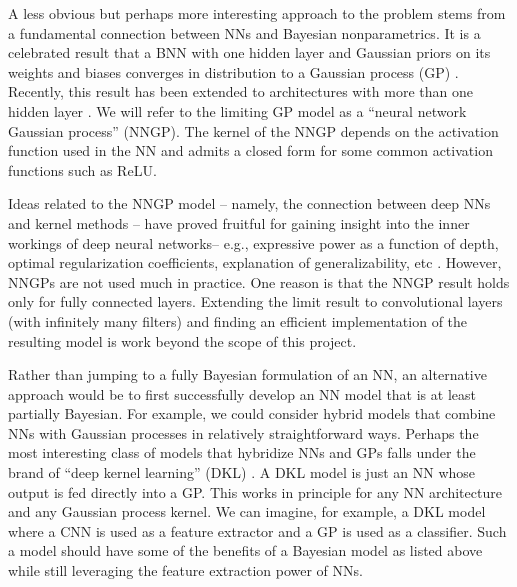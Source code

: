 \documentclass{article}
\begin{document}
A less obvious but perhaps more interesting approach to the problem stems from a fundamental connection between NNs and Bayesian nonparametrics. It is a celebrated result that a BNN with one hidden layer and Gaussian priors on its weights and biases converges in distribution to a Gaussian process (GP) \cite{neal1996priors, williams1997computing}. Recently, this result has been extended to architectures with more than one hidden layer \cite{LeeNNGP, MatthewsGhahramaniGPWide}. We will refer to the limiting GP model as a ``neural network Gaussian process'' (NNGP). The kernel of the NNGP depends on the activation function used in the NN and admits a closed form for some common activation functions such as ReLU.

Ideas related to the NNGP model -- namely, the connection between deep NNs and kernel methods -- have proved fruitful for gaining insight into the inner workings of deep neural networks-- e.g., expressive power as a function of depth, optimal regularization coefficients, explanation of generalizability, etc \cite{cho2009kernel, raghu2016expressive, poole2016exponential, schoenholz2016deep, hazan2015steps}. However, NNGPs are not used much in practice. One reason is that the NNGP result holds only for fully connected layers. Extending the limit result to convolutional layers (with infinitely many filters) and finding an efficient implementation of the resulting model is work beyond the scope of this project.

Rather than jumping to a fully Bayesian formulation of an NN, an alternative approach would be to first successfully develop an NN model that is at least partially Bayesian. For example, we could consider hybrid models that combine NNs with Gaussian processes in relatively straightforward ways. Perhaps the most interesting class of models that hybridize NNs and GPs falls under the brand of ``deep kernel learning'' (DKL) \cite{WilsonDKL, wilson2016stochastic, izmailov2017scalable, bradshaw2017adversarial}. A DKL model is just an NN whose output is fed directly into a GP. This works in principle for any NN architecture and any Gaussian process kernel. We can imagine, for example, a DKL model where a CNN is used as a feature extractor and a GP is used as a classifier. Such a model should have some of the benefits of a Bayesian model as listed above while still leveraging the feature extraction power of NNs.
\end{document}
